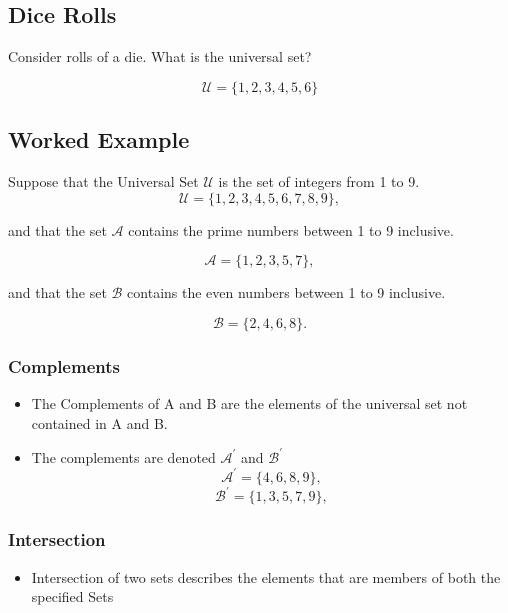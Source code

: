 \documentclass{article}
\begin{document}
\begin{center}
\subsection*{Dice Rolls}
Consider rolls of a die. What is the universal set?

\[ \mathcal{U} = \{1,2,3,4,5,6\} \]

\subsection*{Worked Example}

Suppose that the Universal Set $\mathcal{U}$ is the set of integers from 1 to 9.
\[ \mathcal{U} = \{1,2,3,4,5,6,7,8,9\}, \]

and that the set $\mathcal{A}$ contains the prime numbers between 1 to 9 inclusive.

\[ \mathcal{A} = \{1,2,3,5,7\}, \]

and that the set $\mathcal{B}$ contains the even numbers between 1 to 9 inclusive.

\[ \mathcal{B} = \{2,4,6,8\}. \]

\subsubsection*{Complements}
\begin{itemize}

\item The Complements of A and B are the elements of the universal set not contained in A and B.

\item The complements are denoted $\mathcal{A}^{\prime}$ and $\mathcal{B}^{\prime}$
\[ \mathcal{A}^{\prime} = \{4,6,8,9\}, \]
\[ \mathcal{B}^{\prime} = \{1,3,5,7,9\}, \]

\end{itemize}



\subsubsection*{Intersection}
\begin{itemize}

\item Intersection of two sets describes the elements that are members of both the specified Sets


\end{itemize}
\end{center}
\end{document}
